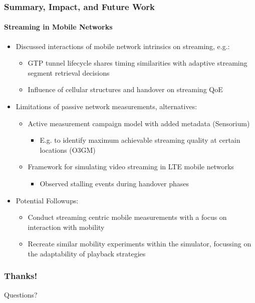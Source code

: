 \documentclass{beamer}
\begin{document}
\begin{frame}
	\frametitle{Summary, Impact, and Future Work}
	\framesubtitle{Streaming in Mobile Networks}

	\begin{itemize}
		\item Discussed interactions of mobile network intrinsics on streaming, e.g.:
		\begin{itemize}
			\item GTP tunnel lifecycle shares timing similarities with adaptive streaming segment retrieval decisions
			\item Influence of cellular structures and handover on streaming QoE
		\end{itemize}
		\item Limitations of passive network measurements, alternatives:
		\begin{itemize}
			\item Active measurement campaign model with added metadata (Sensorium)
			\begin{itemize}
				\item E.g. to identify maximum achievable streaming quality at certain locations (O3GM)
			\end{itemize}
			\item Framework for simulating video streaming in LTE mobile networks
			\begin{itemize}
				\item Observed stalling events during handover phases
			\end{itemize}
		\end{itemize}
		\item Potential Followups:
		\begin{itemize}
			\item Conduct streaming centric mobile measurements with a focus on interaction with mobility
			\item Recreate similar mobility experiments within the simulator, focussing on the adaptability of playback strategies
		\end{itemize}
	\end{itemize}

\end{frame}


\begin{frame}
	\frametitle{Thanks!}

	\centering
		\Large Questions?
\end{frame}
\end{document}
